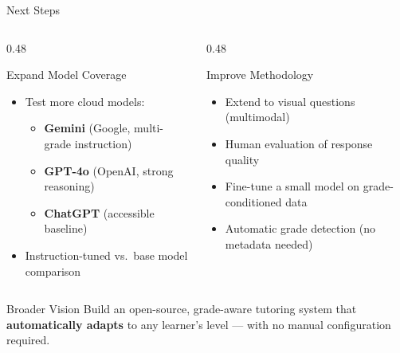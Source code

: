 \documentclass[aspectratio=169]{beamer}
\begin{document}
\begin{frame}{Next Steps}
\begin{columns}[T]
  \begin{column}{0.48\textwidth}
    \begin{block}{Expand Model Coverage}
      \begin{itemize}\itemsep5pt
        \item Test more cloud models:
          \begin{itemize}
            \item \textbf{Gemini} (Google, multi-grade instruction)
            \item \textbf{GPT-4o} (OpenAI, strong reasoning)
            \item \textbf{ChatGPT} (accessible baseline)
          \end{itemize}
     
        \item Instruction-tuned vs.\ base model comparison
      \end{itemize}
    \end{block}
  \end{column}
  \begin{column}{0.48\textwidth}
    \begin{block}{Improve Methodology}
      \begin{itemize}\itemsep5pt
        \item Extend to visual questions (multimodal)
        \item Human evaluation of response quality
        \item Fine-tune a small model on grade-conditioned data
        \item Automatic grade detection (no metadata needed)
        
      \end{itemize}
    \end{block}
  \end{column}
\end{columns}


\begin{block}{Broader Vision}
  \centering
  Build an open-source, grade-aware tutoring system that
  \textbf{automatically adapts} to any learner's level ---
  with no manual configuration required.
\end{block}
\end{frame}
\end{document}
